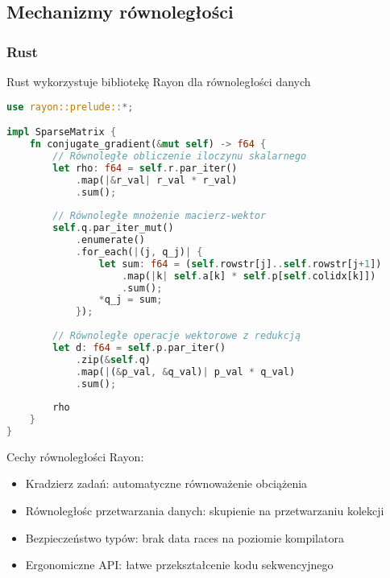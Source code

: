 \subsection{Mechanizmy równoległości}
\subsubsection{Rust}
Rust wykorzystuje bibliotekę Rayon dla równoległości danych
\begin{lstlisting}[language=Rust, caption={Równoległość danych w Rust z Rayon}, label={lst:cg_rust_parallelism}]
use rayon::prelude::*;

impl SparseMatrix {
    fn conjugate_gradient(&mut self) -> f64 {
        // Równoległe obliczenie iloczynu skalarnego
        let rho: f64 = self.r.par_iter()
            .map(|&r_val| r_val * r_val)
            .sum();
        
        // Równoległe mnożenie macierz-wektor
        self.q.par_iter_mut()
            .enumerate()
            .for_each(|(j, q_j)| {
                let sum: f64 = (self.rowstr[j]..self.rowstr[j+1])
                    .map(|k| self.a[k] * self.p[self.colidx[k]])
                    .sum();
                *q_j = sum;
            });
        
        // Równoległe operacje wektorowe z redukcją
        let d: f64 = self.p.par_iter()
            .zip(&self.q)
            .map(|(&p_val, &q_val)| p_val * q_val)
            .sum();
        
        rho
    }
}
\end{lstlisting}
Cechy równoległości Rayon:
\begin{itemize}
    \item Kradzierz zadań: automatyczne równoważenie obciążenia
    \item Równoległośc przetwarzania danych: skupienie na przetwarzaniu kolekcji
    \item Bezpieczeństwo typów: brak data races na poziomie kompilatora
    \item Ergonomiczne API: łatwe przekształcenie kodu sekwencyjnego
\end{itemize}

